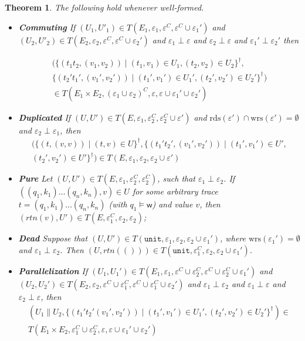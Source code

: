 \documentclass[nocopyrightspace,preprint]{sigplanconf}
\newcommand{\keywd}[1]{\mathtt{#1}}
\newcommand{\unittype}{\keywd{unit}}
\newcommand{\unitval}{\keywd{()}}
\newcommand{\rdsin}[1]{\mathrm{rds}({#1})}
\newcommand{\wrsin}[1]{\mathrm{wrs}({#1})}
\newcommand{\mypar}[2]{#1 \| #2}
\newcommand{\eff}{\varepsilon}
\newtheorem{theorem}{Theorem}[section]
\newcommand\w{\ensuremath{\mathsf{w}}\xspace}
\begin{document}
\begin{theorem}\label{mainzwei}
The following hold whenever well-formed. 
\begin{itemize}
\item \textbf{Commuting} \label{commusound} If $(U_1,U'_1)\in T(E_1,\eff_1,\eff^C,\eff^C \cup \eff_1')$ and 
$(U_2,U'_2)\in T(E_2,\eff_2,\eff^C,\eff^C \cup \eff_2')$ and $\eff_1\perp\eff$ and $\eff_2\perp\eff$ and $\eff_1'\perp\eff_2'$ then
\begin{small}
\[  
\begin{array}{c}
 (\{(t_1t_2,(v_1,v_2))\mid (t_1,v_1)\in U_1, (t_2,v_2)\in U_2\}^\dagger,\\ 
 \{(t_2't_1',(v_1',v_2'))\mid (t_1',v_1')\in U_1', (t_2',v_2')\in U_2'\}^\dagger)\\
 \in T(E_1\times E_2,(\eff_1\cup\eff_2)^C,\eff,\eff\cup \eff_1'\cup\eff_2')
\end{array}
\] 
\end{small}\item\textbf{Duplicated} \label{dupsound} 
If $(U,U') \in T(E,\eff_1,\eff_2^C,\eff_2^C \cup \eff')$ and $\rdsin{\eff'} \cap \wrsin{\eff'} = \emptyset$ and $\eff_2 \perp \eff_1$, then
\[
\begin{array}{c}
 (\{(t,(v,v))\mid (t,v)\in U\}^\dagger,
\{(t_1't_2',(v_1',v_2'))\mid 
(t_1',v_1') \in U', \\
 (t_2',v_2') \in U'\}^\dagger) \in T(E,\eff_1,\eff_2,\eff_2 \cup \eff')  
\end{array}
\]
\item \label{puresound} \textbf{Pure} Let $(U,U') \in T(E,\eff_1, \eff_2^C,\eff_2^C)$, such that $\eff_1\perp\eff_2$. If $((q_1,k_1)\dots(q_n,k_n),v) \in U$ for some \emph{arbitrary} trace $t=(q_1,k_1)\dots(q_n,k_n)$ (with $q_1\models \w$) and  value $v$, then $(\textit{rtn}(v),U') \in T(E,\eff_1^C,\eff_2,\eff_2)$;

\item\label{deadsound} \textbf{Dead} Suppose that $(U,U')\in T(\unittype, \eff_1,\eff_2,\eff_2\cup\eff_1')$, where $\wrsin{\eff_1'}=\emptyset$  and $\eff_1 \perp \eff_2$. Then $(U,\textit{rtn}(\unitval)) \in T(\unittype, \eff_1^C,\eff_2,\eff_2\cup\eff_1')$.





\item\label{parizesound} 
 \textbf{Parallelization} If $(U_1,U_1') \in T(E_1,\eff_1,\eff^C \cup \eff_2^C,\eff^C \cup \eff_2^C \cup \eff_1') $ and $(U_2,U_2') \in T(E_2,\eff_2,\eff^C \cup \eff_1^C,\eff^C \cup \eff_1^C \cup \eff_2')$ and $\eff_1 \perp \eff_2$ and $\eff_1 \perp \eff$ and $\eff_2 \perp \eff$, then 
\[
\begin{array}{c}
(\mypar{U_1}{U_2},\{(t_1't_2'(v_1',v_2'))\mid 
(t_1',v_1') \in U_1', (t_2',v_2') \in U_2'\}^\dagger) \in \\
  T(E_1 \times E_2,\eff_1^C \cup \eff_2^C, \eff, \eff \cup \eff_1' \cup \eff_2')
\end{array}
\]
\end{itemize}
\end{theorem}
\end{document}
